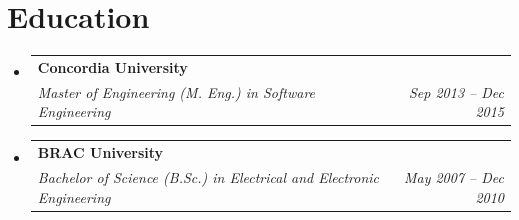 \documentclass[a4paper,11pt]{article}
\makeatletter
\newcommand{\resumeQuadHeading}[4]{
  \item
  \begin{tabular*}{0.96\textwidth}[t]{l@{\extracolsep{\fill}}r}
    \textbf{#1} & #2 \\
    \textit{\small#3} & \textit{\small #4} \\
  \end{tabular*}
}
\newcommand{\resumeHeadingListStart}{
  \begin{itemize}[leftmargin=0.15in, label={}]
}
\newcommand{\resumeHeadingListEnd}{\end{itemize}}
\makeatother
\begin{document}

\section{Education}
  \resumeHeadingListStart{}
    \resumeQuadHeading{Concordia University}{}
    {Master of Engineering (M. Eng.) in Software Engineering}{Sep 2013 -- Dec 2015}
    \resumeQuadHeading{BRAC University}{}
    {Bachelor of Science (B.Sc.) in Electrical and Electronic Engineering}{May 2007 -- Dec 2010}
  \resumeHeadingListEnd{}
\end{document}
